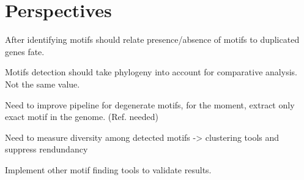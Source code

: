 \section*{Perspectives}

After identifying motifs should relate presence/absence of motifs to duplicated genes fate.

Motifs detection should take phylogeny into account for comparative analysis. Not the same value.

Need to improve pipeline for degenerate motifs, for the moment, extract only exact motif in the genome. (Ref. needed)

Need to measure diversity among detected motifs -> clustering tools and suppress rendundancy

Implement other motif finding tools to validate results.
